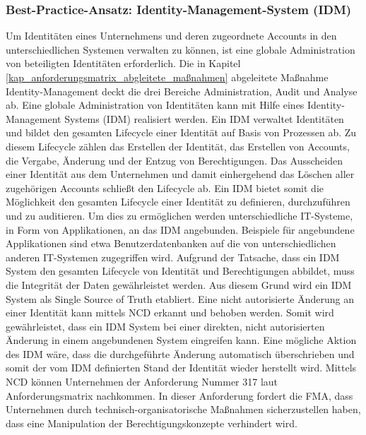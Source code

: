 \subsubsection{Best-Practice-Ansatz: Identity-Management-System (IDM)}
Um Identitäten eines Unternehmens und deren zugeordnete Accounts in den unterschiedlichen Systemen verwalten zu können, ist eine globale Administration von beteiligten Identitäten erforderlich. Die in Kapitel \ref{kap_anforderungsmatrix_abgleitete_maßnahmen} abgeleitete Maßnahme \glqq{}Identity-Management\grqq{} deckt die drei Bereiche \glqq{}Administration\grqq{}, \glqq{}Audit\grqq{} und \glqq{}Analyse\grqq{} ab. Eine globale Administration von Identitäten kann mit Hilfe eines \glqq{}Identity-Management Systems\grqq{} (IDM) realisiert werden. Ein IDM verwaltet Identitäten und bildet den gesamten Lifecycle einer Identität auf Basis von Prozessen ab. Zu diesem Lifecycle zählen das Erstellen der Identität, das Erstellen von Accounts, die Vergabe, Änderung und der Entzug von Berechtigungen. Das Ausscheiden einer Identität aus dem Unternehmen und damit einhergehend das Löschen aller zugehörigen Accounts schließt den Lifecycle ab. Ein IDM bietet somit die Möglichkeit den gesamten Lifecycle einer Identität zu definieren, durchzuführen und zu auditieren. Um dies zu ermöglichen werden unterschiedliche IT-Systeme, in Form von \glqq{}Applikationen\grqq{}, an das IDM angebunden. Beispiele für angebundene Applikationen sind etwa Benutzerdatenbanken auf die von unterschiedlichen anderen IT-Systemen zugegriffen wird. 
\bigbreak
Aufgrund der Tatsache, dass ein IDM System den gesamten Lifecycle von Identität und Berechtigungen abbildet, muss die Integrität der Daten gewährleistet werden. Aus diesem Grund wird ein IDM System als \glqq{}Single Source of Truth\grqq{} etabliert. Eine nicht autorisierte Änderung an einer Identität kann mittels NCD erkannt und behoben werden. Somit wird gewährleistet, dass ein IDM System bei einer direkten, nicht autorisierten Änderung in einem angebundenen System eingreifen kann. Eine mögliche Aktion des IDM wäre, dass die durchgeführte Änderung automatisch überschrieben und somit der vom IDM definierten Stand der Identität wieder herstellt wird. Mittels NCD können Unternehmen der Anforderung Nummer 317 laut Anforderungsmatrix nachkommen. In dieser Anforderung fordert die FMA, dass Unternehmen durch technisch-organisatorische Maßnahmen sicherzustellen haben, dass eine Manipulation der Berechtigungskonzepte verhindert wird.\\


